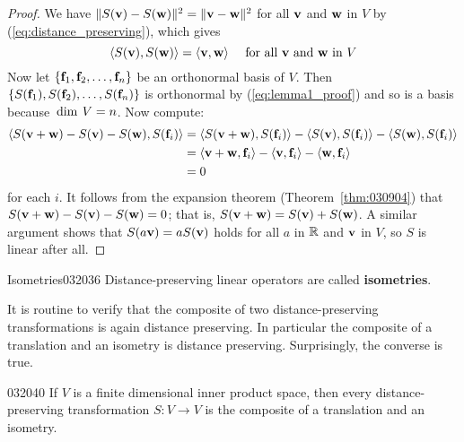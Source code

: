 \begin{proof}
We have $\| S(\textbf{v}) - S(\textbf{w})\|^{2} = \|\textbf{v} - \textbf{w}\|^{2}$ for all $\textbf{v}$ and $\textbf{w}$ in $V$ by (\ref{eq:distance_preserving}), which gives
\begin{equation}
\label{eq:lemma1_proof}
\langle S(\textbf{v}), S(\textbf{w}) \rangle = \langle \textbf{v}, \textbf{w} \rangle \quad \mbox{ for all } \textbf{v} \mbox{ and } \textbf{w} \mbox{ in } V
\end{equation}
Now let $\{\textbf{f}_{1}, \textbf{f}_{2}, \dots, \textbf{f}_{n}\}$ be an orthonormal basis of $V$. Then $\{S(\textbf{f}_{1}), S(\textbf{f}_{2}), \dots, S(\textbf{f}_{n})\}$ is orthonormal by (\ref{eq:lemma1_proof}) and so is a basis because $\thinspace\operatorname{dim\medspace} V = n$. Now compute:
\begin{align*}
\langle S(\textbf{v} + \textbf{w}) - S(\textbf{v}) - S(\textbf{w}), S(\textbf{f}_i) \rangle 
&= \langle S(\textbf{v} + \textbf{w}), S(\textbf{f}_i) \rangle - \langle S(\textbf{v}), S(\textbf{f}_i) \rangle - \langle S(\textbf{w}), S(\textbf{f}_i) \rangle \\
&= \langle \textbf{v} + \textbf{w}, \textbf{f}_i \rangle - \langle \textbf{v}, \textbf{f}_i \rangle - \langle \textbf{w}, \textbf{f}_i \rangle \\
&= 0
\end{align*}
for each $i$. It follows from the expansion theorem (Theorem~\ref{thm:030904}) that $S(\textbf{v} + \textbf{w}) - S(\textbf{v}) - S(\textbf{w}) = 0$; that is, $S(\textbf{v} + \textbf{w}) = S(\textbf{v}) + S(\textbf{w})$. A similar argument shows that $S(a\textbf{v}) = aS(\textbf{v})$ holds for all $a$ in $\mathbb{R}$ and $\textbf{v}$ in $V$, so $S$ is linear after all.
\end{proof}

\begin{definition}{Isometries}{032036}
Distance-preserving linear operators are called \textbf{isometries}.
\end{definition}

It is routine to verify that the composite of two distance-preserving transformations is again distance preserving. In particular the composite of a translation and an isometry is distance preserving. Surprisingly, the converse is true.

\begin{theorem}{}{032040}
If $V$ is a finite dimensional inner product space, then every distance-preserving transformation $S : V \to V$ is the composite of a translation and an isometry.
\end{theorem}

